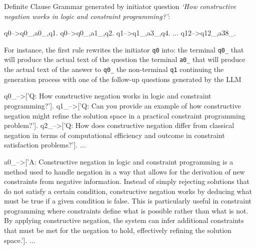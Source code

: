 \documentclass[submission,copyright,creativecommons]{eptcs}
\begin{document}
\BX
Definite Clause Grammar generated by initiator question {\em `How constructive negation works in logic and constraint programming?'}:

\begin{code}

q0-->q0_,a0_,q1.
q0-->q0_,a1_,q2.
q1-->q1_,a3_,q4.
...
q12-->q12_,a38_.
\end{code}
For instance, the first rule rewrites the initiator {\tt q0} into:
\BI
\I the terminal {\tt q0\_} that will produce the actual text of the question
\I the terminal {\tt a0\_} that will produce the actual text of the answer to {\tt q0\_}
\I the non-terminal {\tt q1} continuing the generation process with one of the follow-up questions generated by the LLM
\EI
\begin{code}

q0_-->['Q: How constructive negation works in logic and constraint programming?'].
q1_-->['Q: Can you provide an example of how constructive negation might refine 
   the solution space in a practical constraint programming problem?'].
q2_-->['Q: How does constructive negation differ from classical negation in terms 
   of computational efficiency and outcome in constraint satisfaction problems?'].
   ...
\end{code}

\begin{code}

a0_-->['A: Constructive negation in logic and constraint programming is a method 
    used to handle negation in a way that allows for the derivation of new 
    constraints from negative information. Instead of simply rejecting solutions 
    that do not satisfy a certain condition, constructive negation works by 
    deducing what must be true if a given condition is false. This is particularly
    useful in constraint programming where constraints define what is possible
    rather than what is not. By applying constructive negation, the system can
    infer additional constraints that must be met for the negation to hold,
    effectively refining the solution space.'].
    ...
\end{code}
\end{document}
